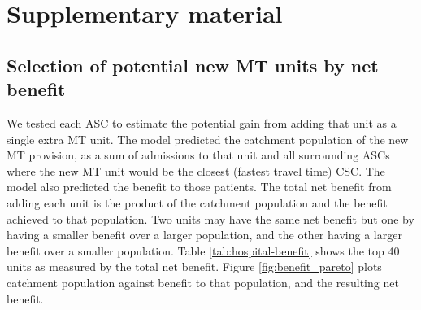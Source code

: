 \section{Supplementary material}

\subsection{Selection of potential new MT units by net benefit}

We tested each ASC to estimate the potential gain from adding that unit as a single extra MT unit. The model predicted the catchment population of the new MT provision, as a sum of admissions to that unit and all surrounding ASCs where the new MT unit would be the closest (fastest travel time) CSC. The model also predicted the benefit to those patients. The total net benefit from adding each unit is the product of the catchment population and the benefit achieved to that population. Two units may have the same net benefit but one by having a smaller benefit over a larger population, and the other having a larger benefit over a smaller population. Table \ref{tab:hospital-benefit} shows the top 40 units as measured by the total net benefit. Figure \ref{fig:benefit_pareto} plots catchment population against benefit to that population, and the resulting net benefit.


